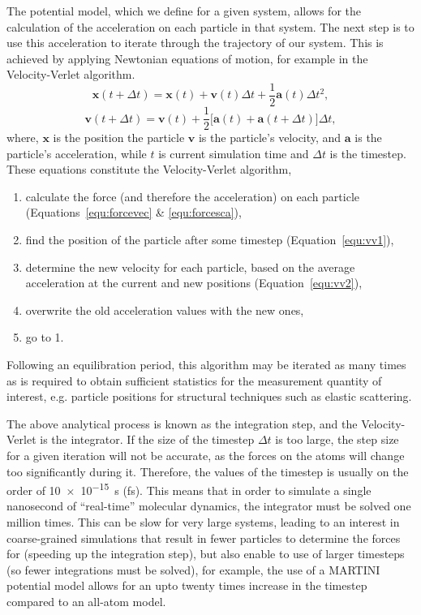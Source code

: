 The potential model, which we define for a given system, allows for the calculation of the acceleration on each particle in that system.
The next step is to use this acceleration to iterate through the trajectory of our system.
This is achieved by applying Newtonian equations of motion, for example in the Velocity-Verlet algorithm.\autocite{swope_computer_1982}
%
\begin{equation}
\mathbf{x}(t + \Delta t) = \mathbf{x}(t) + \mathbf{v}(t)\Delta t + \frac{1}{2}\mathbf{a}(t)\Delta t^2,
\label{equ:vv1}
\end{equation}
\begin{equation}
\mathbf{v}(t + \Delta t) = \mathbf{v}(t) + \frac{1}{2}\big[\mathbf{a}(t) + \mathbf{a}(t+\Delta t)\big]\Delta t,
\label{equ:vv2}
\end{equation}
%
where, $\mathbf{x}$ is the position the particle $\mathbf{v}$ is the particle's velocity, and $\mathbf{a}$ is the particle's acceleration, while $t$ is current simulation time and $\Delta t$ is the timestep.
These equations constitute the Velocity-Verlet algorithm,
%
\begin{enumerate}
\item calculate the force (and therefore the acceleration) on each particle (Equations~\ref{equ:forcevec} \& \ref{equ:forcesca}),
\item find the position of the particle after some timestep (Equation~\ref{equ:vv1}),
\item determine the new velocity for each particle, based on the average acceleration at the current and new positions (Equation~\ref{equ:vv2}),
\item overwrite the old acceleration values with the new ones,
\item go to 1.
\end{enumerate}
%
Following an equilibration period, this algorithm may be iterated as many times as is required to obtain sufficient statistics for the measurement quantity of interest, e.g. particle positions for structural techniques such as elastic scattering.

The above analytical process is known as the integration step, and the Velocity-Verlet is the integrator.
If the size of the timestep $\Delta t$ is too large, the step size for a given iteration will not be accurate, as the forces on the atoms will change too significantly during it.
Therefore, the values of the timestep is usually on the order of \SI{10e-15}{\second} (\si{\femto\second}).
This means that in order to simulate a single nanosecond of ``real-time'' molecular dynamics, the integrator must be solved one million times.
This can be slow for very large systems, leading to an interest in coarse-grained simulations that result in fewer particles to determine the forces for (speeding up the integration step), but also enable to use of larger timesteps (so fewer integrations must be solved),\autocite{rudd_coarse-grained_1998,brini_systematic_2013} for example, the use of a MARTINI potential model allows for an upto twenty times increase in the timestep compared to an all-atom model.

